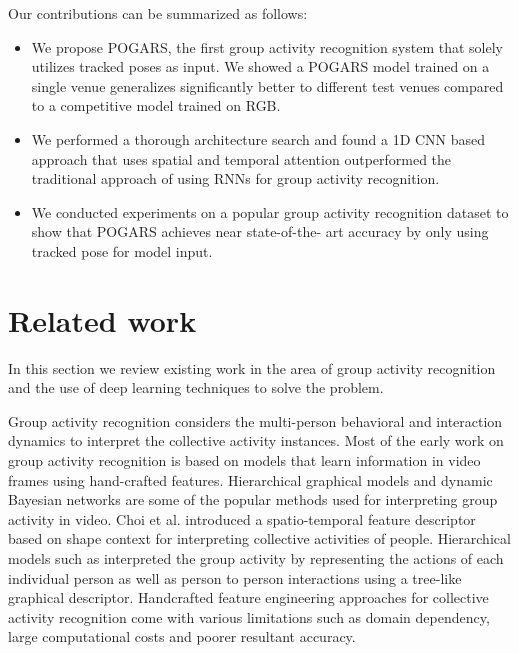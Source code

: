 \documentclass[a4paper,fleqn]{cas-dc}
\begin{document}
Our contributions can be summarized as follows:
\begin{itemize}
  \item We propose POGARS, the first group activity recognition system that solely utilizes tracked poses as input. We showed a POGARS model trained on a single venue generalizes significantly better to different test venues compared to a competitive model trained on RGB.
  \item We performed a thorough architecture search and found a 1D CNN based approach that uses spatial and temporal attention outperformed the traditional approach of using RNNs for group activity recognition.
  \item We conducted experiments on a popular group activity recognition dataset to show that POGARS achieves near state-of-the- art accuracy by only using tracked pose for model input.
\end{itemize}

\section{Related work}
\label{sec:Related-work}
In this section we review existing work in the area of group activity recognition and the use of deep learning techniques to solve the problem.

Group activity recognition considers the multi-person behavioral and interaction dynamics to interpret the collective activity instances. 
Most of the early work on group activity recognition is based on models that learn information in video frames using hand-crafted features. 
Hierarchical graphical models \cite{Lan2012_discriminativeLatentModels,Amer2014_hirf} and dynamic Bayesian networks \cite{Zhu2013_contextAware} are some of the popular methods used for interpreting group activity in video. 
Choi et al. \cite{Choi2009_colllectiveActivity} introduced a spatio-temporal feature descriptor  based on shape context \cite{Belongie2002_shapeMatching} for interpreting collective activities of people. 
Hierarchical models such as \cite{Lan2012_discriminativeLatentModels} interpreted the group activity by representing the actions of each individual person as well as person to person interactions using a tree-like graphical descriptor. 
Handcrafted feature engineering approaches for collective activity recognition come with various limitations such as domain dependency, large computational costs and poorer resultant accuracy.
\end{document}
